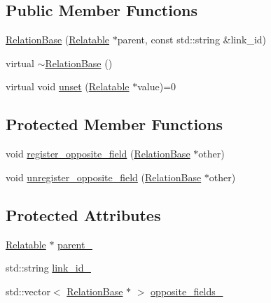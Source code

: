 \subsection*{Public Member Functions}
\begin{DoxyCompactItemize}
\item 
\hyperlink{classkglt_1_1_relation_base_aee3c648d61d38868b57388bc01b5732d}{Relation\-Base} (\hyperlink{classkglt_1_1_relatable}{Relatable} $\ast$parent, const std\-::string \&link\-\_\-id)
\item 
virtual \hyperlink{classkglt_1_1_relation_base_acb8dbe7604d97d507106f086a51d2b49}{$\sim$\-Relation\-Base} ()
\item 
virtual void \hyperlink{classkglt_1_1_relation_base_a991db88f41288e9cd267801b8ca4fb80}{unset} (\hyperlink{classkglt_1_1_relatable}{Relatable} $\ast$value)=0
\end{DoxyCompactItemize}
\subsection*{Protected Member Functions}
\begin{DoxyCompactItemize}
\item 
void \hyperlink{classkglt_1_1_relation_base_a54d71d21de5b2ac234e39eed63ecb936}{register\-\_\-opposite\-\_\-field} (\hyperlink{classkglt_1_1_relation_base}{Relation\-Base} $\ast$other)
\item 
void \hyperlink{classkglt_1_1_relation_base_afa6a09706d44d5ec40829134b4bf5e07}{unregister\-\_\-opposite\-\_\-field} (\hyperlink{classkglt_1_1_relation_base}{Relation\-Base} $\ast$other)
\end{DoxyCompactItemize}
\subsection*{Protected Attributes}
\begin{DoxyCompactItemize}
\item 
\hyperlink{classkglt_1_1_relatable}{Relatable} $\ast$ \hyperlink{classkglt_1_1_relation_base_ae1eb73b4104c5684dfb549972d54b891}{parent\-\_\-}
\item 
std\-::string \hyperlink{classkglt_1_1_relation_base_a93f3ecd2c79ea9c9bcc705fcfe2d6cf4}{link\-\_\-id\-\_\-}
\item 
std\-::vector$<$ \hyperlink{classkglt_1_1_relation_base}{Relation\-Base} $\ast$ $>$ \hyperlink{classkglt_1_1_relation_base_ae8efcb162123c8e708c04164c5ab31fe}{opposite\-\_\-fields\-\_\-}
\end{DoxyCompactItemize}


